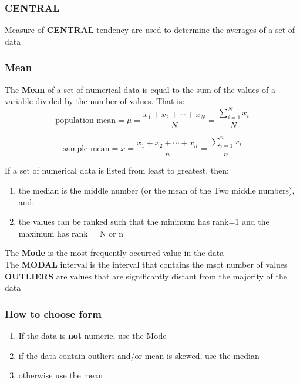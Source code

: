 \subsubsection{CENTRAL}
Measure of \textbf{CENTRAL} tendency are used to determine the averages of a set of data\\

\subsubsection{Mean}
The \textbf{Mean} of a set of numerical data is equal to the sum of the values of a variable divided by the number 
of values. That is:
\begin{equation*}
    \text{population mean} = \mu = \frac{x_1 + x_2 + \cdots + x_N}{N} = \frac{\sum_{i = 1}^{N} x_i}{N}
\end{equation*}

\begin{equation*}
    \text{sample mean} = \bar{x} = \frac{x_1 + x_2 + \cdots + x_n}{n} = \frac{\sum_{i = 1}^{n} x_i}{n}
\end{equation*}

If a set of numerical data is listed from least to greatest, then:
\begin{enumerate}
    \item the median is the middle number (or the mean of the Two middle numbers), and,
    \item the values can be ranked such that the minimum has rank=1 and the maximum has rank = N or n
\end{enumerate}

The \textbf{Mode} is the most frequently occurred value in the data\\

The \textbf{MODAL} interval is the interval that contains the msot number of values\\

\textbf{OUTLIERS} are values that are significantly distant from the majority of the data

\subsubsection{How to choose form}
\begin{enumerate}
    \item If the data is \textbf{not} numeric, use the Mode
    \item if the data contain outliers and/or mean is skewed, use the median
    \item otherwise use the mean
\end{enumerate}
